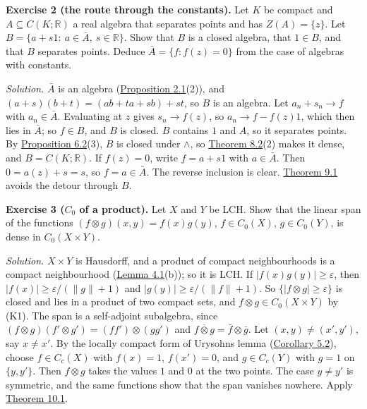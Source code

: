 \documentclass[
  english,
  11pt,
  a4paper,
]{article}
\begin{document}
\textbf{Exercise 2 (the route through the constants).} Let \(K\) be
compact and \(A\subseteq C(K;\mathbb R)\) a real algebra that separates
points and has \(Z(A)=\{z\}\). Let
\(B=\{a+s1:\ a\in\bar A,\ s\in\mathbb R\}\). Show that \(B\) is a closed
algebra, that \(1\in B\), and that \(B\) separates points. Deduce
\(\bar A=\{f:f(z)=0\}\) from the case of algebras with constants.

\emph{Solution.} \(\bar A\) is an algebra
(\hyperlink{the-stone-weierstrass-theorem-for-functions-vanishing-at-infinity--oa-fnd-sw-01}{Proposition
2.1}(2)), and \((a+s)(b+t)=(ab+ta+sb)+st\), so \(B\) is an algebra. Let
\(a_n+s_n\to f\) with \(a_n\in\bar A\). Evaluating at \(z\) gives
\(s_n\to f(z)\), so \(a_n\to f-f(z)1\), which then lies in \(\bar A\);
so \(f\in B\), and \(B\) is closed. \(B\) contains \(1\) and \(A\), so
it separates points. By
\hyperlink{the-stone-weierstrass-theorem-for-functions-vanishing-at-infinity--oa-fnd-sw-04}{Proposition
6.2}(3), \(B\) is closed under \(\wedge\), so
\hyperlink{the-stone-weierstrass-theorem-for-functions-vanishing-at-infinity--oa-fnd-sw-06}{Theorem
8.2}(2) makes it dense, and \(B=C(K;\mathbb R)\). If \(f(z)=0\), write
\(f=a+s1\) with \(a\in\bar A\). Then \(0=a(z)+s=s\), so
\(f=a\in\bar A\). The reverse inclusion is clear.
\hyperlink{the-stone-weierstrass-theorem-for-functions-vanishing-at-infinity--oa-fnd-sw-07}{Theorem
9.1} avoids the detour through \(B\).

\textbf{Exercise 3 (\(C_0\) of a product).} Let \(X\) and \(Y\) be LCH.
Show that the linear span of the functions
\((f\otimes g)(x,y)=f(x)g(y)\), \(f\in C_0(X)\), \(g\in C_0(Y)\), is
dense in \(C_0(X\times Y)\).

\emph{Solution.} \(X\times Y\) is Hausdorff, and a product of compact
neighbourhoods is a compact neighbourhood
(\hyperlink{the-stone-weierstrass-theorem-for-functions-vanishing-at-infinity--oa-fnd-sw-15}{Lemma
4.1}(b)); so it is LCH. If \(|f(x)g(y)|\geq\varepsilon\), then
\(|f(x)|\geq\varepsilon/(\|g\|+1)\) and
\(|g(y)|\geq\varepsilon/(\|f\|+1)\). So
\(\{|f\otimes g|\geq\varepsilon\}\) is closed and lies in a product of
two compact sets, and \(f\otimes g\in C_0(X\times Y)\) by (K1). The span
is a self-adjoint subalgebra, since
\((f\otimes g)(f'\otimes g')=(ff')\otimes(gg')\) and
\(\overline{f\otimes g}=\bar f\otimes\bar g\). Let \((x,y)\neq(x',y')\),
say \(x\neq x'\). By the locally compact form of
Urysohn\textquotesingle s lemma
(\hyperlink{the-stone-weierstrass-theorem-for-functions-vanishing-at-infinity--oa-fnd-sw-16}{Corollary
5.2}), choose \(f\in C_c(X)\) with \(f(x)=1\), \(f(x')=0\), and
\(g\in C_c(Y)\) with \(g=1\) on \(\{y,y'\}\). Then \(f\otimes g\) takes
the values \(1\) and \(0\) at the two points. The case \(y\neq y'\) is
symmetric, and the same functions show that the span vanishes nowhere.
Apply
\hyperlink{the-stone-weierstrass-theorem-for-functions-vanishing-at-infinity--oa-fnd-sw-09}{Theorem
10.1}.
\end{document}
